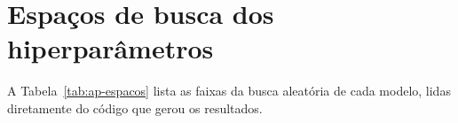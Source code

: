 \chapter{Espaços de busca dos hiperparâmetros}
\label{ap:hiperparametros}

A Tabela~\ref{tab:ap-espacos} lista as faixas da busca aleatória de cada
modelo, lidas diretamente do código que gerou os resultados.


